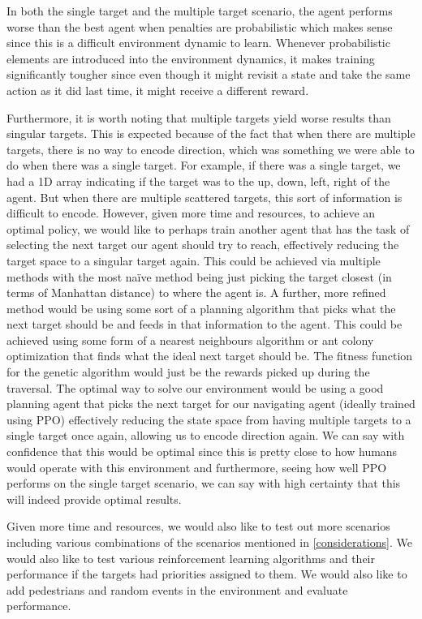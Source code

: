 \documentclass{article}
\begin{document}
In both the single target and the multiple target scenario, the agent performs worse than the best agent when penalties are probabilistic which makes sense since this is a difficult environment dynamic to learn. Whenever probabilistic elements are introduced into the environment dynamics, it makes training significantly tougher since even though it might revisit a state and take the same action as it did last time, it might receive a different reward.

Furthermore, it is worth noting that multiple targets yield worse results than singular targets. This is expected because of the fact that when there are multiple targets, there is no way to encode direction, which was something we were able to do when there was a single target. For example, if there was a single target, we had a 1D array indicating if the target was to the up, down, left, right of the agent. But when there are multiple scattered targets, this sort of information is difficult to encode. However, given more time and resources, to achieve an optimal policy, we would like to perhaps train another agent that has the task of selecting the next target our agent should try to reach, effectively reducing the target space to a singular target again. This could be achieved via multiple methods with the most na\"ive method being just picking the target closest (in terms of Manhattan distance) to where the agent is. A further, more refined method would be using some sort of a planning algorithm that picks what the next target should be and feeds in that information to the agent. This could be achieved using some form of a nearest neighbours algorithm or ant colony optimization that finds what the ideal next target should be. The fitness function for the genetic algorithm would just be the rewards picked up during the traversal. The optimal way to solve our environment would be using a good planning agent that picks the next target for our navigating agent (ideally trained using PPO) effectively reducing the state space from having multiple targets to a single target once again, allowing us to encode direction again. We can say with confidence that this would be optimal since this is pretty close to how humans would operate with this environment and furthermore, seeing how well PPO performs on the single target scenario, we can say with high certainty that this will indeed provide optimal results.

Given more time and resources, we would also like to test out more scenarios including various combinations of the scenarios mentioned in \ref{considerations}. We would also like to test various reinforcement learning algorithms and their performance if the targets had priorities assigned to them. We would also like to add pedestrians and random events in the environment and evaluate performance.
\end{document}
